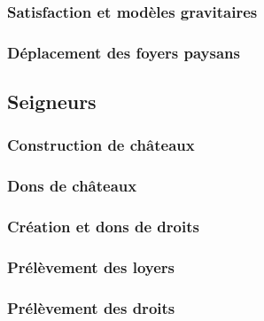 	\subsubsection{Satisfaction et modèles gravitaires}
	\subsubsection{Déplacement des foyers paysans}

\subsection{Seigneurs}
	\subsubsection{Construction de châteaux}
	\subsubsection{Dons de châteaux}
	\subsubsection{Création et dons de droits}
	\subsubsection{Prélèvement des loyers}
	\subsubsection{Prélèvement des droits}

\printbibliography[title={Références}]

